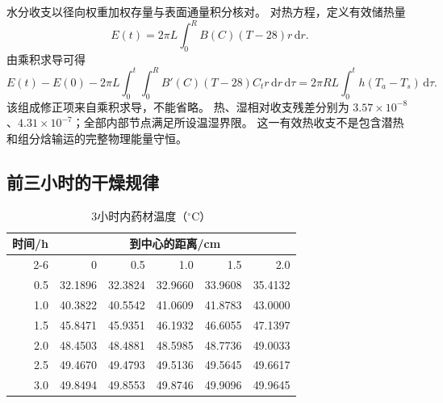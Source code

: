 水分收支以径向权重加权存量与表面通量积分核对。
对热方程，定义有效储热量
\begin{equation}
E(t)=2\pi L\int_0^R B(C)(T-28)r\,\mathrm dr.
\end{equation}
由乘积求导可得
\begin{equation}
E(t)-E(0)-2\pi L\int_0^t\!\int_0^R
B'(C)(T-28)C_t r\,\mathrm dr\,\mathrm d\tau
=2\pi RL\int_0^t h(T_a-T_s)\,\mathrm d\tau.
\end{equation}
该组成修正项来自乘积求导，不能省略。
热、湿相对收支残差分别为 $3.57\times10^{-8}$、$4.31\times10^{-7}$；全部内部节点满足所设温湿界限。
这一有效热收支不是包含潜热和组分焓输运的完整物理能量守恒。

\subsection{前三小时的干燥规律}

\begin{table}[H]
\centering
\caption{3小时内药材温度（$^\circ\mathrm C$）}\label{tab:q2_T}
\small
\begin{tabular}{rrrrrr}
\toprule
时间/h & \multicolumn{5}{c}{到中心的距离/cm}\\
\cmidrule(lr){2-6}
 & 0 & 0.5 & 1.0 & 1.5 & 2.0\\
\midrule
0.5 & 32.1896 & 32.3824 & 32.9660 & 33.9608 & 35.4132 \\
1.0 & 40.3822 & 40.5542 & 41.0609 & 41.8783 & 43.0000 \\
1.5 & 45.8471 & 45.9351 & 46.1932 & 46.6055 & 47.1397 \\
2.0 & 48.4503 & 48.4881 & 48.5985 & 48.7736 & 49.0033 \\
2.5 & 49.4670 & 49.4793 & 49.5136 & 49.5645 & 49.6617 \\
3.0 & 49.8494 & 49.8553 & 49.8746 & 49.9096 & 49.9645 \\
\bottomrule
\end{tabular}
\end{table}

